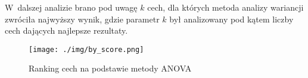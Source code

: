 W~dalszej analizie brano pod uwagę $k$ cech, dla których metoda analizy wariancji zwróciła najwyższy wynik, gdzie parametr $k$ był analizowany pod kątem liczby cech dających najlepsze rezultaty.


\begin{figure}[h]
    \texttt{[image: ./img/by\_score.png]}
    \caption{Ranking cech na podstawie metody ANOVA} \label{fig:by_score}
\end{figure}

\clearpage